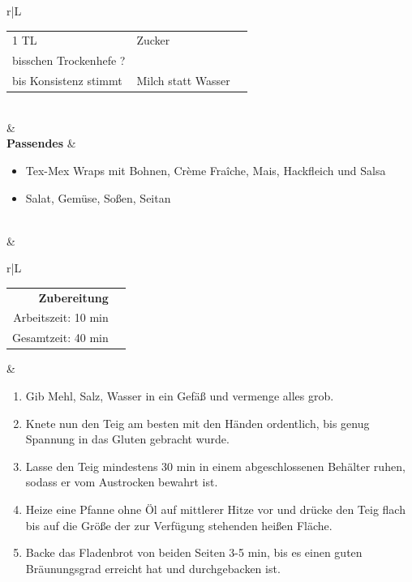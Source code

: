 \documentclass[a4paper, 12pt]{scrbook} 								%
\numberwithin{equation}{section} 									%
\begin{document}
\begin{tabularx}{\textwidth}{r|L}
\begin{itemize}[nosep]
\begin{tabular}{lll}
												1 TL & Zucker \\
												bisschen Trockenhefe ?\\
												bis Konsistenz stimmt & Milch statt Wasser \\
											\end{tabular} 
										\end{itemize}	\\
									&	\\	
			\textbf{Passendes}		&	\begin{itemize}[nosep]
											\item Tex-Mex Wraps mit Bohnen, Crème Fraîche, Mais, Hackfleich und Salsa
											\item Salat, Gemüse, Soßen, Seitan 
										\end{itemize}	\\
									&	\\
		\end{tabularx}
									\newpage

		\begin{tabularx}{\textwidth}{r|L}										
			\begin{tabular}[t]{rr}
				\textbf{Zubereitung}	\\
				Arbeitszeit: 10 min	\\
				Gesamtzeit:	40 min		\\
			\end{tabular}			&	\begin{enumerate}[nosep]
											\item Gib Mehl, Salz, Wasser in ein Gefäß und vermenge alles grob.
											\item Knete nun den Teig am besten mit den Händen ordentlich, bis genug Spannung in das Gluten gebracht wurde.
											\item Lasse den Teig mindestens 30 min in einem abgeschlossenen Behälter ruhen, sodass er vom Austrocken bewahrt ist.
											\item Heize eine Pfanne ohne Öl auf mittlerer Hitze vor und drücke den Teig flach bis auf die Größe der zur Verfügung stehenden heißen Fläche.
											\item Backe das Fladenbrot von beiden Seiten 3-5 min, bis es einen guten Bräunungsgrad erreicht hat und durchgebacken ist.
										\end{enumerate}	\\
		\end{tabularx}
\end{document}

